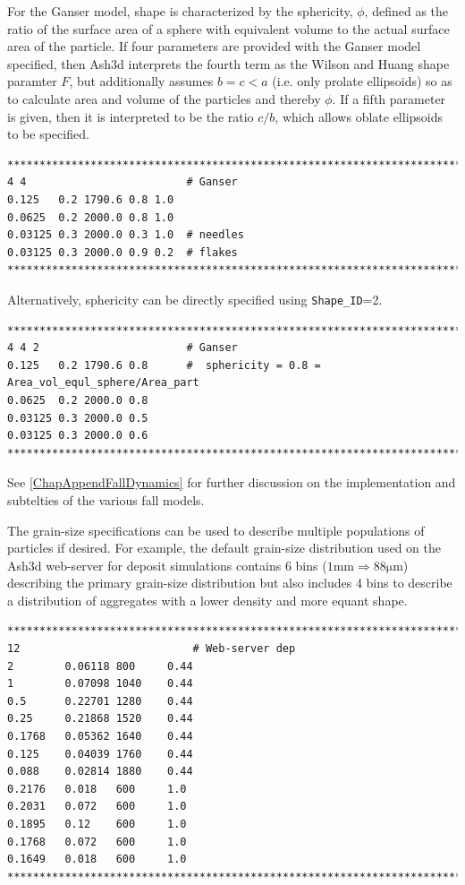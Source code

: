 \normalsize
For the Ganser model, shape is characterized by the sphericity, $\phi$, defined as the
ratio of the surface area of a sphere with equivalent volume to the actual surface area
of the particle. If four parameters are provided with the Ganser model specified, then
Ash3d interprets the fourth term as the Wilson and Huang shape paramter $F$, but
additionally assumes $b=c<a$ (i.e. only prolate ellipsoids) so as to calculate area and
volume of the particles and thereby $\phi$.
If a fifth parameter is given, then it is interpreted to 
be the ratio $c/b$, which allows oblate ellipsoids to be specified.
\small
\begin{verbatim}
*******************************************************************************
4 4                         # Ganser
0.125   0.2 1790.6 0.8 1.0
0.0625  0.2 2000.0 0.8 1.0
0.03125 0.3 2000.0 0.3 1.0  # needles
0.03125 0.3 2000.0 0.9 0.2  # flakes
*******************************************************************************
\end{verbatim}
\normalsize
Alternatively, sphericity can be directly specified using \texttt{Shape\_ID}=2.
\small
\begin{verbatim}
*******************************************************************************
4 4 2                       # Ganser
0.125   0.2 1790.6 0.8      #  sphericity = 0.8 = Area_vol_equl_sphere/Area_part
0.0625  0.2 2000.0 0.8
0.03125 0.3 2000.0 0.5
0.03125 0.3 2000.0 0.6
*******************************************************************************
\end{verbatim}
\normalsize
See \ref{ChapAppendFallDynamics} for further discussion on the implementation and
subtelties of the various fall models.

The grain-size specifications can be used to describe multiple populations of particles
if desired. For example, the default grain-size distribution used on the Ash3d
web-server for deposit simulations contains 6 bins
($1 \mathrm{mm} \Rightarrow 88 \mathrm{\mu m}$) describing the primary grain-size distribution
but also includes 4 bins to describe a distribution of aggregates with a lower density
and more equant shape.
\small
\begin{verbatim}
*******************************************************************************
12                           # Web-server dep
2        0.06118 800     0.44
1        0.07098 1040    0.44
0.5      0.22701 1280    0.44
0.25     0.21868 1520    0.44
0.1768   0.05362 1640    0.44
0.125    0.04039 1760    0.44
0.088    0.02814 1880    0.44
0.2176   0.018   600     1.0
0.2031   0.072   600     1.0
0.1895   0.12    600     1.0
0.1768   0.072   600     1.0
0.1649   0.018   600     1.0
*******************************************************************************
\end{verbatim}
\normalsize

